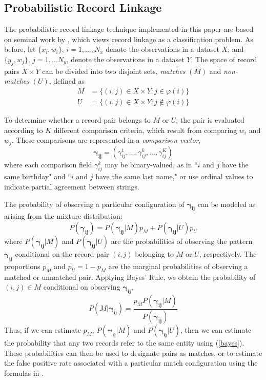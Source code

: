 \documentclass[12pt]{article}
\newcommand\gamij{\mathbf{\gamma_{ij}}}
\begin{document}
\subsection{Probabilistic Record Linkage}
The probabilistic record linkage technique implemented in this paper are based on seminal work by \cite{fellegi69}, which views record linkage as a classification problem.  As before, let $\{x_i, w_i\}$, $i=1,\dots,N_x$ denote the observations in a dataset $X$; and $\{y_j,w_j\}$, $j=1, \dots N_y$, denote the observations in a dataset $Y$.  The space of record pairs $X \times Y$ can be divided into two disjoint sets, \textit{matches} $(M)$ and \textit{non-matches} $(U)$, defined as
\begin{align*} M &= \{ (i,j) \in X\times Y: j \in \varphi(i) \} \\ U &= \{(i,j) \in X\times Y:  j \notin\varphi(i)\}\end{align*} 

 To determine whether a record pair belongs to $M$ or $U$, the pair is evaluated according to $K$ different comparison criteria, which result from comparing $w_i$ and $w_j$.  These comparisons are represented in a \textit{comparison vector}, $$\mathbf{\gamma_{ij}}= (\gamma_{ij}^1, \dots, \gamma_{ij}^{k}, \dots, \gamma_{ij}^K)$$  where each comparison field $\gamma_{ij}^{k}$ may be binary-valued, as in ``$i$ and $j$ have the same birthday" and ``$i$ and $j$ have the same last name," or use ordinal values to indicate partial agreement between strings.

The probability of observing a particular configuration of $\gamij$ can be modeled as arising from the mixture distribution:
\begin{equation}
P(\gamij) = P(\gamij | M) p_M + P(\gamij | U) p_U 
\label{mm}
\end{equation}
where $P(\gamij | M)$ and $P(\gamij | U)$ are the probabilities of observing the pattern $\gamij$ conditional on the record pair $(i,j)$ belonging to $M$ or $U$, respectively.  The proportions $p_M$ and $p_U = 1-p_M$ are the marginal probabilities of observing a matched or unmatched pair.  Applying Bayes' Rule, we obtain the probability of $(i,j) \in M$ conditional on observing $\gamij$,
\begin{equation} P(M | \gamij) = \frac{p_M P(\gamij | M)}{P(\gamij)} \label{bayes} \end{equation}
Thus, if we can estimate $p_M$, $P(\gamij | M)$ and $P(\gamij | U)$, then we can estimate the probability that any two records refer to the same entity using (\ref{bayes}).   These probabilities can then be used to designate pairs as matches, or to estimate the false positive rate associated with a particular match configuration using the formulas in \cite{fellegi69}.  
\end{document}
